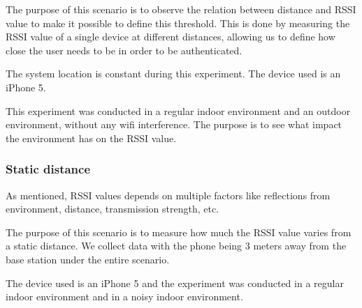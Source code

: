 The purpose of this scenario is to observe the relation between distance and RSSI value to make it possible to  define  this threshold. This is done by measuring the RSSI value of a single device at different distances, allowing us to define how close the user needs to be in order to be authenticated.

The system location is constant during this experiment. The device used is an iPhone 5.

This experiment was conducted in a regular indoor environment and an outdoor environment, without any wifi interference. The purpose is to see what impact the environment has on the RSSI value.


\subsubsection{Static distance}
\label{section:MovingTowardsSystem}
As mentioned, RSSI values depends on multiple factors like reflections from environment, distance, transmission strength, etc. 

The purpose of this scenario is to measure how much the RSSI value varies from a static distance. We collect data with the phone being 3 meters away from the base station under the entire scenario.

The device used is an iPhone 5 and the experiment was conducted in a regular indoor environment and in a noisy indoor environment.



